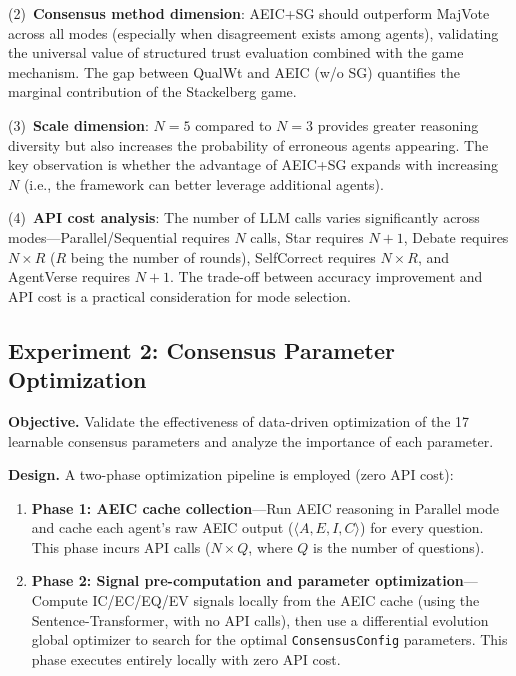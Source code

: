 \documentclass[12pt,a4paper]{article}
\begin{document}
(2)~\textbf{Consensus method dimension}: AEIC+SG should outperform MajVote across all modes (especially when disagreement exists among agents), validating the universal value of structured trust evaluation combined with the game mechanism. The gap between QualWt and AEIC (w/o SG) quantifies the marginal contribution of the Stackelberg game.

(3)~\textbf{Scale dimension}: $N=5$ compared to $N=3$ provides greater reasoning diversity but also increases the probability of erroneous agents appearing. The key observation is whether the advantage of AEIC+SG expands with increasing $N$ (i.e., the framework can better leverage additional agents).

(4)~\textbf{API cost analysis}: The number of LLM calls varies significantly across modes---Parallel/Sequential requires $N$ calls, Star requires $N+1$, Debate requires $N \times R$ ($R$ being the number of rounds), SelfCorrect requires $N \times R$, and AgentVerse requires $N+1$. The trade-off between accuracy improvement and API cost is a practical consideration for mode selection.

\subsection{Experiment 2: Consensus Parameter Optimization}\label{sec:exp2}

\textbf{Objective.} Validate the effectiveness of data-driven optimization of the 17 learnable consensus parameters and analyze the importance of each parameter.

\textbf{Design.} A two-phase optimization pipeline is employed (zero API cost):
\begin{enumerate}[nosep]
    \item \textbf{Phase 1: AEIC cache collection}---Run AEIC reasoning in Parallel mode and cache each agent's raw AEIC output ($\langle A, E, I, C \rangle$) for every question. This phase incurs API calls ($N \times Q$, where $Q$ is the number of questions).
    \item \textbf{Phase 2: Signal pre-computation and parameter optimization}---Compute IC/EC/EQ/EV signals locally from the AEIC cache (using the Sentence-Transformer, with no API calls), then use a differential evolution global optimizer to search for the optimal \texttt{ConsensusConfig} parameters. This phase executes entirely locally with zero API cost.
\end{enumerate}
\end{document}
